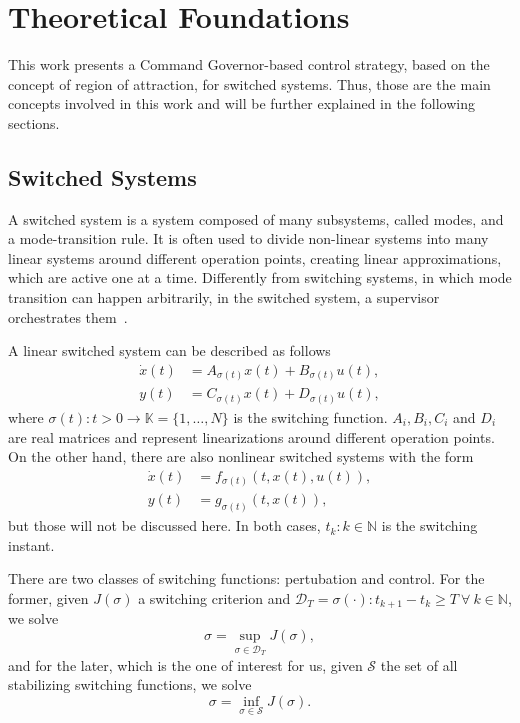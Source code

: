 
\chapter{Theoretical Foundations}%
\label{chp:theoretical-foundations}

This work presents a Command Governor-based control strategy, based on the
concept of region of attraction, for switched systems. Thus, those are the main
concepts involved in this work and will be further explained in the following
sections.

\section{Switched Systems}%
\label{sec:switched-systems}

A switched system is a system composed of many subsystems, called modes, and a
mode-transition rule. It is often used to divide non-linear systems into many
linear systems around different operation points, creating linear
approximations, which are active one at a time. Differently from switching
systems, in which mode transition can happen arbitrarily, in the switched
system, a supervisor orchestrates
them~\parencite{lucia.franzè:stabilization,liberzon.morse:basic}.

A linear switched system can be described as follows
%
\begin{align}
  \dot{x}(t) & = A_{\sigma(t)}x(t) + B_{\sigma(t)}u(t), \\
  y(t)       & = C_{\sigma(t)}x(t) + D_{\sigma(t)}u(t),
\end{align}
%
where \(\sigma(t):t>0\rightarrow\mathbb{K}=\{1,\ldots,N\}\) is the switching function.
\(A_{i}, B_{i}, C_{i}\) and \(D_{i}\) are real matrices and represent
linearizations around different operation points. On the other hand, there are
also nonlinear switched systems with the form
%
\begin{align}
  \dot{x}(t) & = f_{\sigma(t)}(t,x(t),u(t)), \\
  y(t)       & = g_{\sigma(t)}(t,x(t)),
\end{align}
%
but those will not be discussed here. In both cases, \(t_{k}:k\in\mathbb{N}\) is
the switching instant.

There are two classes of switching functions: pertubation and control. For the
former, given \(J(\sigma)\) a switching criterion and
\(\mathcal{D}_{T}=\sigma(\cdot):t_{k+1}-t_{k}\ge{}T~\forall{}~k\in{}\mathbb{N}\), we solve
%
\begin{equation}
  \sigma = \sup_{\sigma\in\mathcal{D}_{T}} J(\sigma),
\end{equation}
%
and for the later, which is the one of interest for us, given \(\mathcal{S}\)
the set of all stabilizing switching functions, we solve
%
\begin{equation}
  \sigma = \inf_{\sigma\in\mathcal{S}} J(\sigma).
\end{equation}

